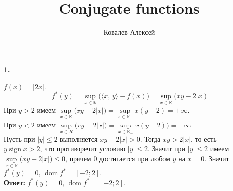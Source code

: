 \documentclass{article}
\title{Conjugate functions}
\author{Ковалев Алексей}
\date{}
\DeclareMathOperator{\dom}{dom}
\DeclareMathOperator{\sign}{sign}
\newcommand*{\R}{\mathbb{R}}
\begin{document}
\maketitle

\paragraph{1.} $ f(x) = |2x|. $
\[ f^\ast(y) = \sup\limits_{x \in \R} \! \big( \langle x,\, y \rangle - f(x) \big) = \sup\limits_{x \in \R} \! \big( xy - 2|x| \big) \]
При $ y > 2 $ имеем $ \sup\limits_{x \in \R} \big(xy - 2|x|\big) = \sup\limits_{x \in \R_+} x(y - 2) = +\infty $. \\
При $ y < 2 $ имеем $ \sup\limits_{x \in R} \big( xy - 2|x| \big) = \sup\limits_{x \in \R_-} x(y + 2) ) = +\infty $. \\
Пусть при $ |y| \leqslant 2 $ выполняется $ xy - 2|x| > 0 $. Тогда $ xy > 2|x| $, то есть $ y \sign x > 2 $, что противоречит условию $ |y| \leqslant 2 $. Значит при $ |y| \leqslant 2 $ имеем $ \sup\limits_{x \in \R}\big( xy - 2|x| \big) \leqslant 0 $, причем 0 достигается при любом $y$ на $x =  0$. Значит $f^\ast(y) = 0,\, \dom f^\ast = [-2; 2]$. \\
\textbf{Ответ:} $f^\ast(y) = 0,\, \dom f^\ast = [-2; 2]$.
\end{document}
